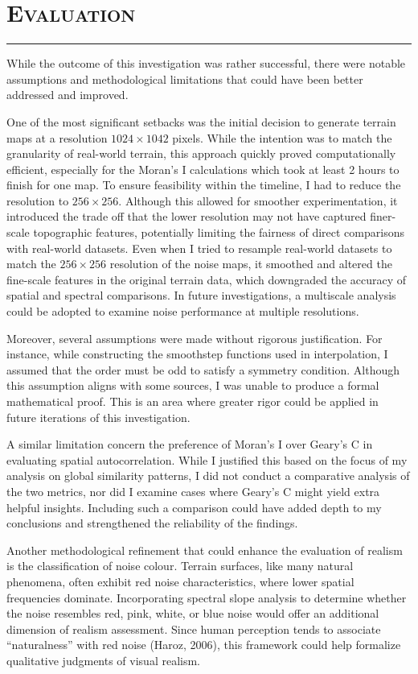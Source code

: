 \section{\textsc{Evaluation}}
\hrule height 0.5pt
\vspace*{2.5pt}

While the outcome of this investigation was rather successful, there were notable assumptions and methodological limitations that could 
have been better addressed and improved.

One of the most significant setbacks was the initial decision to generate terrain maps at a resolution $1024\times1042$ pixels. While the intention 
was to match the granularity of real-world terrain, this approach quickly proved computationally efficient, especially for the Moran's I calculations 
which took at least 2 hours to finish for one map. To ensure feasibility within the timeline, I had to reduce the resolution to $256\times256$. Although 
this allowed for smoother experimentation, it introduced the trade off that the lower resolution may not have captured finer-scale topographic features, 
potentially limiting the fairness of direct comparisons with real-world datasets. Even when I tried to resample real-world datasets to match the $256\times256$
resolution of the noise maps, it smoothed and altered the fine-scale features in the original terrain data, which downgraded the accuracy of spatial and 
spectral comparisons. In future investigations, a multiscale analysis could be adopted to examine noise performance at multiple resolutions.  

Moreover, several assumptions were made without rigorous justification. For instance, while constructing the smoothstep functions used in interpolation, I assumed 
that the order must be odd to satisfy a symmetry condition. Although this assumption aligns with some sources, I was unable to produce a formal mathematical proof. 
This is an area where greater rigor could be applied in future iterations of this investigation. 

A similar limitation concern the preference of Moran's I over Geary's C in evaluating spatial autocorrelation. While I justified this based on the focus of my 
analysis on global similarity patterns, I did not conduct a comparative analysis of the two metrics, nor did I examine cases where Geary's C might yield extra 
helpful insights. Including such a comparison could have added depth to my conclusions and strengthened the reliability of the findings. 

Another methodological refinement that could enhance the evaluation of realism is the classification of noise colour. Terrain surfaces, like many natural phenomena, 
often exhibit red noise characteristics, where lower spatial frequencies dominate. Incorporating spectral slope analysis to determine whether the noise resembles 
red, pink, white, or blue noise would offer an additional dimension of realism assessment. Since human perception tends to associate “naturalness” with red noise 
(Haroz, 2006), this framework could help formalize qualitative judgments of visual realism.

